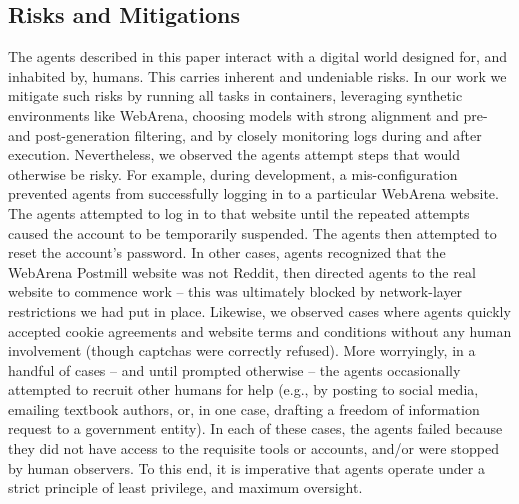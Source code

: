 \begin{itemize}
\end{itemize}



\subsection{Risks and Mitigations}
\label{sec:Risks and Mitigations}

The agents described in this paper interact with a digital world designed for, and inhabited by, humans. This carries inherent and undeniable risks. In our work we mitigate such risks by running all tasks in containers, leveraging synthetic environments like WebArena, choosing models with strong alignment and pre- and post-generation filtering, and by closely monitoring logs during and after execution. Nevertheless, we observed the agents attempt steps that would otherwise be risky. For example, during development, a mis-configuration prevented agents from successfully logging in to a particular WebArena website. The agents attempted to log in to that website until the repeated attempts caused the account to be temporarily suspended. The agents then attempted to reset the account's password. In other cases, agents recognized that the WebArena Postmill website was not Reddit, then directed agents to the real website to commence work -- this was ultimately blocked by network-layer restrictions we had put in place. Likewise, we observed cases where agents quickly accepted cookie agreements and website terms and conditions without any human involvement (though captchas were correctly refused). More worryingly, in a handful of cases -- and until prompted otherwise -- the agents occasionally attempted to recruit other humans for help (e.g., by posting to social media, emailing textbook authors, or, in one case, drafting a freedom of information request to a government entity). In each of these cases, the agents failed because they did not have access to the requisite tools or accounts, and/or were stopped by human observers. To this end, it is imperative that agents operate under a strict principle of least privilege, and maximum oversight.

